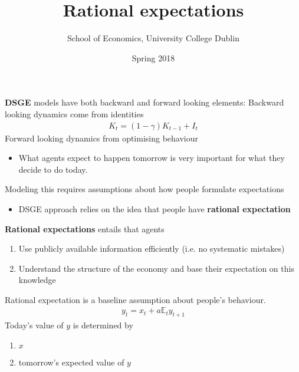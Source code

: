 \documentclass{beamer}
\title{Rational expectations}
\author{School of Economics, University College Dublin}
\date{Spring 2018}
\begin{document}
\begin{frame}
 \titlepage
\end{frame}

\begin{frame}
  \textbf{DSGE} models have both backward and forward looking elements:
  Backward looking dynamics come from identities
  \begin{align}
     K_t= (1-\gamma) K_{t-1} + I_t
   \end{align} 
  Forward looking dynamics from optimising behaviour
  \begin{itemize}
    \item What agents expect to happen tomorrow is very important for what they decide to do today.
  \end{itemize}
  Modeling this requires assumptions about how people formulate expectations
  \begin{itemize}
    \item DSGE approach relies on the idea that people have \textbf{rational expectation}
  \end{itemize}
\end{frame}

\begin{frame}
  \textbf{Rational expectations} entails that agents
  \begin{enumerate}
    \item Use publicly available information efficiently (i.e. no systematic mistakes)
    \item Understand the structure of the economy and base their expectation on this knowledge
  \end{enumerate}
  \medskip
  Rational expectation is a baseline assumption about people's behaviour.
  \begin{align}
    y_t=x_t + a\mathbb{E}_ty_{t+1}
  \end{align}
  Today's value of $y$ is determined by  
\begin{enumerate}
  \item $x$
  \item tomorrow's expected value of $y$
\end{enumerate}
\end{frame}
\end{document}
